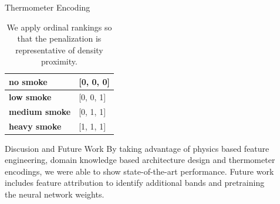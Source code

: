 \documentclass[final,16pt]{beamer}
\newlength{\sepwidth}
\newlength{\colwidth}
\newcommand{\separatorcolumn}{\begin{column}{\sepwidth}\end{column}}
\begin{document}
\begin{frame}[t]
\begin{columns}[t]
\begin{column}{\colwidth}
  \vspace{-1cm}
  \begin{block}{Thermometer Encoding}

    \begin{table}
      \centering
      \begin{tabular}{| p{8cm} | p{5cm} |}
        \hline
        \vspace{.005cm}\textbf{no smoke} & \vspace{.005cm}\hspace{.9cm}[0, 0, 0] \\
        \hline
        \vspace{.005cm}\textbf{low smoke} & \vspace{.005cm}\hspace{.9cm}[0, 0, 1] \\
        \hline
        \vspace{.005cm}\textbf{medium smoke} & \vspace{.005cm}\hspace{.9cm}[0, 1, 1] \\
        \hline
        \vspace{.005cm}\textbf{heavy smoke} & \vspace{.005cm}\hspace{.9cm}[1, 1, 1] \\
        \hline
      \end{tabular}
      \caption{We apply ordinal rankings so that the penalization is representative of density proximity.}
    \end{table}
  \end{block}


  \begin{block}{Discusion and Future Work}
    By taking advantage of physics based feature engineering, domain knowledge based architecture design and thermometer encodings, we were able to show state-of-the-art performance. Future work includes feature attribution to identify additional bands and pretraining the neural network weights.


  \end{block}


\end{column}


\separatorcolumn


\begin{column}{\colwidth}


\end{column}
\end{columns}
\end{frame}
\end{document}
